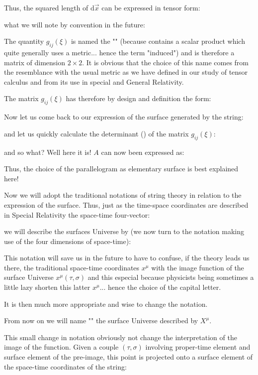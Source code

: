 	Thus, the squared length of $\mathrm{d}\vec{x}$ can be expressed in tensor form:
	
	what we will note by convention in the future:
	
	The quantity $g_{ij}(\xi)$  is named the "" (because contains a scalar product which quite generally uses a metric... hence the term "induced") and is therefore a matrix of dimension $2 \times 2$. It is obvious that the choice of this name comes from the resemblance with the usual metric as we have defined in our study of tensor calculus and from its use in special and General Relativity.
	
	The matrix $g_{ij}(\xi)$ has therefore by design and definition the form:
	
	Now let us come back to our expression of the surface generated by the string:
	
	and let us quickly calculate the determinant () of the matrix $g_{ij}(\xi)$:
	
	and so what? Well here it is! $A$ can now been expressed as:
	
	Thus, the choice of the parallelogram as elementary surface is best explained here!
	
	Now we will adopt the traditional notations of string theory in relation to the expression of the surface. Thus, just as the time-space coordinates are described in Special Relativity the space-time four-vector:
	
	we will describe the surfaces Universe by (we now turn to the notation making use of the four dimensions of space-time):
	
	This notation will save us in the future to have to confuse, if the theory leads us there, the traditional space-time coordinates $x^\mu$ with the image function of the surface Universe $x^\mu(\tau,\sigma)$  and this especial because physicists being sometimes a little lazy shorten this latter $x^\mu$... hence the choice of the capital letter.
	
	It is then much more appropriate and wise to change the notation.
	
	From now on we will name "" the surface Universe described by $X^\mu$.
	
	This small change in notation obviously not change the interpretation of the image of the function. Given a couple $(\tau,\sigma)$ involving proper-time element and surface element of the pre-image, this point is projected onto a surface element of the space-time coordinates of the string:
	
